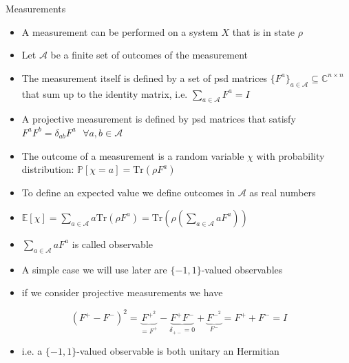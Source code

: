 \begin{frame}{Measurements}
\begin{itemize}
    \item A measurement can be performed on a system $X$ that is in state $\rho$
    \item Let $\mathcal{A}$ be a finite set of outcomes of the measurement
    \item The measurement itself is defined by a set of psd matrices $\{ F^a \}_{a\in \mathcal{A}} \subseteq \mathbb{C}^{n \times n}$ that sum up to the identity matrix, i.e. $\sum_{a \in \mathcal{A}} F^a = I$
    \item A projective measurement is defined by psd matrices that satisfy $F^aF^b = \delta_{ab}F^a \text{ } \forall a,b \in \mathcal{A}$
    \item The outcome of a measurement is a random variable $\chi$ with probability distribution: $\mathbb{P}[ \chi = a ] = \text{Tr}(\rho F^a)$
\end{itemize}
\end{frame}    
    
\begin{frame}
\begin{itemize}   
    \item To define an expected value we define outcomes in $\mathcal{A}$ as real numbers
    \item $\mathbb{E} [\chi ] = \sum_{a \in \mathcal{A}} a \text{Tr} ( \rho F^a ) =  \text{Tr} ( \rho ( \sum_{a \in \mathcal{A}} a F^a))$
    \item $\sum_{a \in \mathcal{A}} aF^a$ is called observable
    \item A simple case we will use later are $\{ -1, 1 \}$-valued observables
    \item if we consider projective measurements we have
\end{itemize}
    \begin{equation*}
(F^+-F^-)^2 = \underbrace{F^{+^2}}_{= F^+}- \underbrace{F^+F^-}_{\delta_{+-}=0} + \underbrace{F^{-^2}}_{F^-} = F^+ + F^- = I
\end{equation*}
\begin{itemize}
    \item i.e. a $\{ -1, 1 \}$-valued observable is both unitary an Hermitian 
\end{itemize}

\end{frame}

